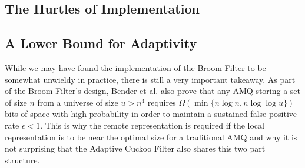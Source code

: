 \documentclass[../paper.tex]{subfiles}
\begin{document}
\subsection{The Hurtles of Implementation}



\subsection{A Lower Bound for Adaptivity}
	While we may have found the implementation of the Broom Filter to be somewhat unwieldy in practice, there is still a very important takeaway.  As part of the Broom Filter's design, Bender et al. also prove that any AMQ storing a set of size $n$ from a universe of size $u > n^4$ requires $\Omega (\min \{n\log n, n\log\log u\})$ bits of space with high probability in order to maintain a sustained false-positive rate $\epsilon < 1$.  This is why the remote representation is required if the local representation is to be near the optimal size for a traditional AMQ and why it is not surprising that the Adaptive Cuckoo Filter also shares this two part structure.  
\end{document}

